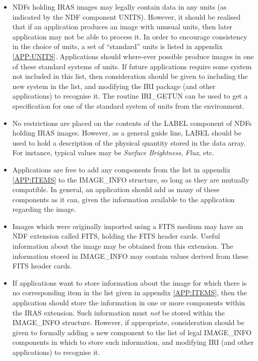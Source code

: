 \begin{itemize}

\item NDFs holding IRAS images may legally contain data in any units (as
indicated by the NDF component UNITS). However, it should be realised that if an
application produces an image with unusual units, then later application may not
be able to process it. In order to encourage consistency in the choice of units,
a set of ``standard'' units is listed in appendix \ref{APP:UNITS}. Applications
should where-ever possible produce images in one of these standard systems of
units. If future applications require some system not included in this list,
then consideration should be given to including the new system in the list, and
modifying the IRI package (and other applications) to recognise it. The routine
IRI\_GETUN can be used to get a specification for one of the standard system of
units from the environment. 

\item No restrictions are placed on the contents of the LABEL component of NDFs
holding IRAS images. However, as a general guide line, LABEL should be used to
hold a description of the physical quantity stored in the data array. For
instance, typical values may be {\em Surface Brightness}, {\em Flux}, etc. 

\item Applications are free to add any components from the list in appendix
\ref{APP:ITEMS} to the IMAGE\_INFO structure, so long as they are mutually
compatible. In general, an application should add as many of these components as
it can, given the information available to the application regarding the image. 

\item Images which were originally imported using a FITS medium may have an NDF 
extension called FITS, holding the FITS header cards. Useful information about
the image may be obtained from this extension. The information stored in 
IMAGE\_INFO may contain values derived from these FITS header cards.

\item If applications want to store information about the image for which there
is no corresponding item in the list given in appendix \ref{APP:ITEMS}, then the
application should store the information in one or more components within the
IRAS extension. Such information must {\em not} be stored within the IMAGE\_INFO
structure. However, if appropriate, consideration should be given to formally
adding a new component to the list of legal IMAGE\_INFO components in which to
store such information, and modifying IRI (and other applications) to recognise
it. 

\end{itemize}


